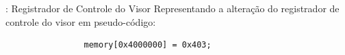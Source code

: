 \documentclass{beamer}
\begin{document}
\begin{darkframes}
\begin{frame}[fragile]{\secname: Registrador de Controle do Visor}
        Representando a alteração do registrador de controle do visor em pseudo-código:

        \begin{center}
            \begin{verbatim}
                memory[0x4000000] = 0x403;
            \end{verbatim}
        \end{center}

\end{frame}

\end{darkframes}
\end{document}
